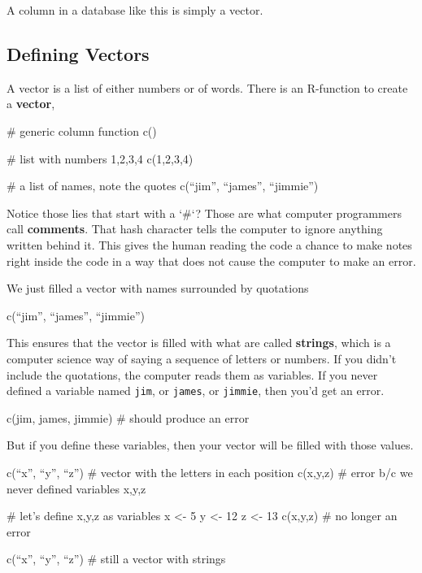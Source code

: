 \documentclass[11pt]{amsart}
\renewcommand{\(}{\left(}
\renewcommand{\)}{\right)}
\newcommand{\define}[1]{\textbf{#1}}
\begin{document}
A column in a database like this is simply a vector.
  
\subsection{Defining Vectors}

A vector is a list of either numbers or of words. There is an
R-function to create a \define{vector},

\begin{rcode}
# generic column function
c()

# list with numbers 1,2,3,4
c(1,2,3,4)

# a list of names, note the quotes
c(``jim'', ``james'', ``jimmie'') 
\end{rcode}

Notice those lies that start with a `\#`?  Those are what computer programmers call \define{comments}.  That hash character tells the computer to ignore anything written behind it. This gives the human reading the code a chance to make notes right inside the code in a way that does not cause the computer to make an error.

We just filled a vector with names surrounded by quotations

\begin{rcode}
  c(``jim'', ``james'', ``jimmie'')
\end{rcode}

This ensures that the vector is filled with what are called
\define{strings}, which is a computer science way of saying a sequence
of letters or numbers. If you didn't include the quotations, the
computer reads them as variables. If you never defined a variable
named \texttt{jim}, or \texttt{james}, or \texttt{jimmie}, then you'd
get an error.

\begin{rcode}
  c(jim, james, jimmie) # should produce an error
\end{rcode}

But if you define these variables, then your vector will be filled
with those values.

\begin{rcode}
  c(``x'', ``y'', ``z'') # vector with the letters in each position
  c(x,y,z) # error b/c we never defined variables x,y,z

  # let's define x,y,z as variables x <- 5 y <- 12 z <- 13 c(x,y,z) #
  no longer an error

    c(``x'', ``y'', ``z'') # still a vector with strings
  \end{rcode}
    
\end{document}
